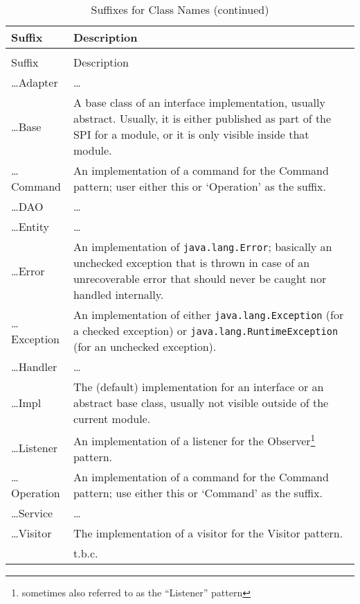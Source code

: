 \begin{longtable}{|l|X|}
  \caption{Suffixes for Class Names} \\
  \hline
  Suffix & Description \\
  \hline\endfirsthead
  \caption{Suffixes for Class Names (continued)} \\
  \hline
  Suffix & Description \\
  \hline\endhead

  …Adapter & … \\
  \hline

  …Base & A base class of an interface implementation, usually abstract. Usually, it is either published as part of the SPI for a module, or it is only visible inside that module. \\
  \hline

  …Command & An implementation of a command for the Command pattern; user either this or ‘Operation’ as the suffix. \\
  \hline

  …DAO & … \\
  \hline

  …Entity & … \\
  \hline

 …Error & An implementation of \lstinline|java.lang.Error|; basically an unchecked exception that is thrown in case of an unrecoverable error that should never be caught nor handled internally. \\
  \hline

  …Exception & An implementation of either \lstinline|java.lang.Exception| (for a checked exception) or \lstinline|java.lang.RuntimeException| (for an unchecked exception). \\
  \hline

  …Handler & … \\
  \hline

  …Impl & The (default) implementation for an interface or an abstract base class, usually not visible outside of the current module.  \\
  \hline

  …Listener & An implementation of a listener for the Observer\footnote{sometimes also referred to as the “Listener” pattern} pattern. \\
  \hline

  …Operation & An implementation of a command for the Command pattern; use either this or ‘Command’ as the suffix. \\
  \hline

  …Service & … \\
  \hline

  …Visitor & The implementation of a visitor for the Visitor pattern. \\
  \hline

  {} & t.b.c. \\
  \hline
\end{longtable}
